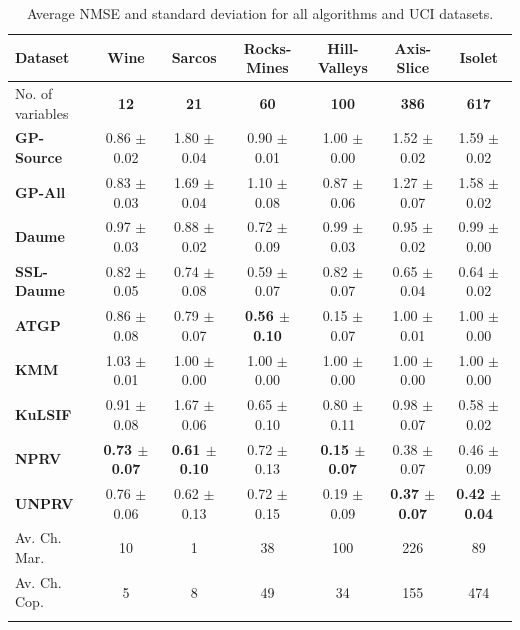 \documentclass{article}
\newcommand{\f}[1]{\textbf{#1}}
\begin{document}
\begin{table}
  \begin{center}
  \caption{Average NMSE and standard deviation for all algorithms and UCI datasets.}
  \resizebox{\linewidth}{!}
  {
  \begin{tabular}{lcccccc}
  \hline
    Dataset & \textbf{Wine}& \textbf{Sarcos}& \textbf{Rocks-Mines}& \textbf{Hill-Valleys}&\textbf{Axis-Slice}&\textbf{Isolet}  \\
  \hline
    No. of variables & \textbf{12}& \textbf{21}& \textbf{60}& \textbf{100}&\textbf{386}&\textbf{617}  \\ \hline
 \f{GP-Source} &    0.86 $\pm$ 0.02  &    1.80 $\pm$ 0.04  &    0.90 $\pm$ 0.01  &    1.00 $\pm$ 0.00  &    1.52 $\pm$ 0.02  &    1.59 $\pm$ 0.02 \\ 
 \f{GP-All   } &    0.83 $\pm$ 0.03  &    1.69 $\pm$ 0.04  &    1.10 $\pm$ 0.08  &    0.87 $\pm$ 0.06  &    1.27 $\pm$ 0.07  &    1.58 $\pm$ 0.02 \\ 
 \f{Daume    } &    0.97 $\pm$ 0.03  &    0.88 $\pm$ 0.02  &    0.72 $\pm$ 0.09  &    0.99 $\pm$ 0.03  &    0.95 $\pm$ 0.02  &    0.99 $\pm$ 0.00 \\ 
 \f{SSL-Daume} &    0.82 $\pm$ 0.05  &    0.74 $\pm$ 0.08  &    0.59 $\pm$ 0.07  &    0.82 $\pm$ 0.07  &    0.65 $\pm$ 0.04  &    0.64 $\pm$ 0.02 \\ 
 \f{ATGP     } &    0.86 $\pm$ 0.08  &    0.79 $\pm$ 0.07  & \f{0.56 $\pm$ 0.10} &    0.15 $\pm$ 0.07  &    1.00 $\pm$ 0.01  &    1.00 $\pm$ 0.00 \\ 
 \f{KMM      } &    1.03 $\pm$ 0.01  &    1.00 $\pm$ 0.00  &    1.00 $\pm$ 0.00  &    1.00 $\pm$ 0.00  &    1.00 $\pm$ 0.00  &    1.00 $\pm$ 0.00 \\ 
 \f{KuLSIF   } &    0.91 $\pm$ 0.08  &    1.67 $\pm$ 0.06  &    0.65 $\pm$ 0.10  &    0.80 $\pm$ 0.11  &    0.98 $\pm$ 0.07  &    0.58 $\pm$ 0.02 \\ 
 \f{NPRV     } & \f{0.73 $\pm$ 0.07} & \f{0.61 $\pm$ 0.10} &    0.72 $\pm$ 0.13  & \f{0.15 $\pm$ 0.07} &   {0.38 $\pm$ 0.07} &    0.46 $\pm$ 0.09 \\ 
 \f{UNPRV    } &    0.76 $\pm$ 0.06  &    0.62 $\pm$ 0.13  &    0.72 $\pm$ 0.15  &    0.19 $\pm$ 0.09  & \f{0.37 $\pm$ 0.07} & \f{0.42 $\pm$ 0.04} \\
    \hline
  Av. Ch. Mar. & 10 & 1 & 38 & 100 & 226 & 89\\
  Av. Ch. Cop. & 5  & 8 & 49 & 34 & 155 & 474\\
  \hline
  \label{table:da_exps}
  \end{tabular}
  }
\end{center}
\end{table}
\end{document}
